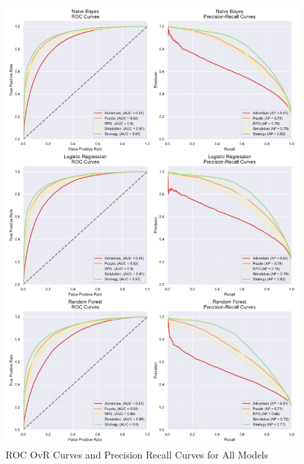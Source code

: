 \begin{figure}[!h]
    \centering
    \includegraphics[width=.9\textwidth]{data/results/plots/combined_roc}
    \caption{ROC OvR Curves and Precision Recall Curves for All Models}
    \label{fig:roc}
\end{figure}
